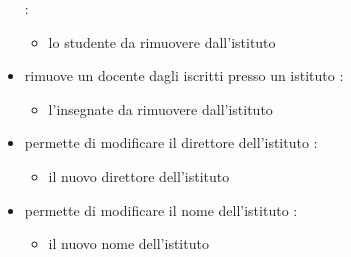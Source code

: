 \begin{itemize}
 :
\begin{itemize}
\item {}
\newline
lo studente da rimuovere dall'istituto
\end{itemize}
\item {}
\newline
rimuove un docente dagli iscritti presso un istituto
\newline
{} :
\begin{itemize}
\item {}
\newline
l'insegnate da rimuovere dall'istituto
\end{itemize}
\item {}
\newline
permette di modificare il direttore dell'istituto
\newline
{} :
\begin{itemize}
\item {}
\newline
il nuovo direttore dell'istituto
\end{itemize}
\item {}
\newline
permette di modificare il nome dell'istituto
\newline
{} :
\begin{itemize}
\item {}
\newline
il nuovo nome dell'istituto
\end{itemize}
\end{itemize}
